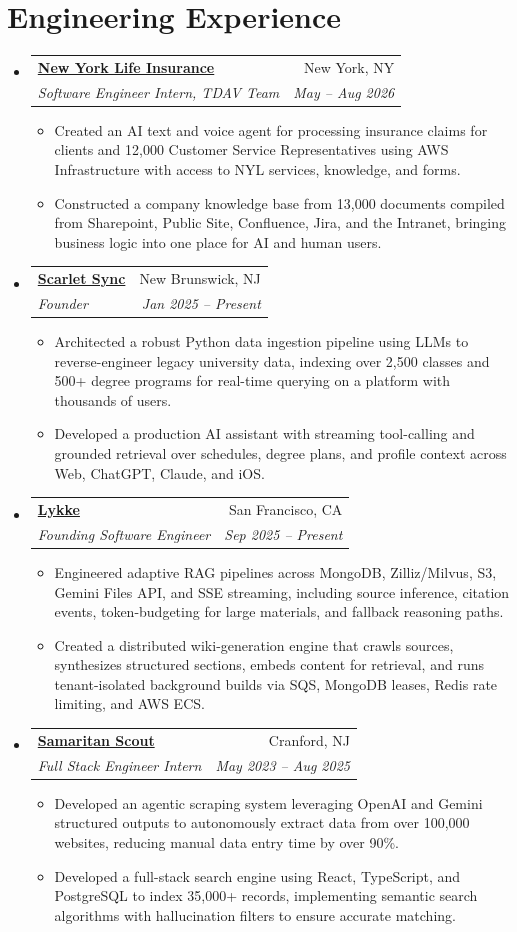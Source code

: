 \documentclass[letterpaper,11pt]{article}
\makeatletter
\newcommand{\resumeItem}[1]{
  \item\small{
    {#1 \vspace{-2pt}}
  }
}
\newcommand{\resumeSubheading}[4]{
  \vspace{-2pt}\item
    \begin{tabular*}{0.97\textwidth}[t]{l@{\extracolsep{\fill}}r}
      \textbf{#1} & #2 \\
      \textit{\small#3} & \textit{\small #4} \\
    \end{tabular*}\vspace{-7pt}
}
\newcommand{\resumeSubHeadingListStart}{\begin{itemize}[leftmargin=0.15in, label={}]}
\newcommand{\resumeSubHeadingListEnd}{\end{itemize}}
\newcommand{\resumeItemListStart}{\begin{itemize}}
\newcommand{\resumeItemListEnd}{\end{itemize}\vspace{-5pt}}
\makeatother
\begin{document}
\section{Engineering Experience}
  \resumeSubHeadingListStart
  \resumeSubheading
      {\href{https://newyorklife.com/}{New York Life Insurance}}{New York, NY}
      {Software Engineer Intern, TDAV Team}{May -- Aug 2026}
      \resumeItemListStart
        \resumeItem{Created an AI text and voice agent for processing insurance claims for clients and 12,000 Customer Service Representatives using AWS Infrastructure with access to NYL services, knowledge, and forms.}
        \resumeItem{Constructed a company knowledge base from 13,000 documents compiled from Sharepoint, Public Site, Confluence, Jira, and the Intranet, bringing business logic into one place for AI and human users.}
      \resumeItemListEnd
    \resumeSubheading
      {\href{https://scarletsync.app/}{Scarlet Sync}}{New Brunswick, NJ}
      {Founder}{Jan 2025 -- Present}
      \resumeItemListStart
        \resumeItem{Architected a robust Python data ingestion pipeline using LLMs to reverse-engineer legacy university data, indexing over 2,500 classes and 500+ degree programs for real-time querying on a platform with thousands of users.}
        \resumeItem{Developed a production AI assistant with streaming tool-calling and grounded retrieval over schedules, degree plans, and profile context across Web, ChatGPT, Claude, and iOS.}
      \resumeItemListEnd
    \resumeSubheading
  {\href{https://getlykke.com/}{Lykke}}{San Francisco, CA}
  {Founding Software Engineer}{Sep 2025 -- Present}
  \resumeItemListStart
    \resumeItem{Engineered adaptive RAG pipelines across MongoDB, Zilliz/Milvus, S3, Gemini Files API, and SSE streaming, including source inference, citation events, token-budgeting for large materials, and fallback reasoning paths.}
    \resumeItem{Created a distributed wiki-generation engine that crawls sources, synthesizes structured sections, embeds content for retrieval, and runs tenant-isolated background builds via SQS, MongoDB leases, Redis rate limiting, and AWS ECS.}
  \resumeItemListEnd
    \resumeSubheading
      {\href{https://www.samaritanscout.org/}{Samaritan Scout}}{Cranford, NJ}
      {Full Stack Engineer Intern}{May 2023 -- Aug 2025}
      \resumeItemListStart
        \resumeItem{Developed an agentic scraping system leveraging OpenAI and Gemini structured outputs to autonomously extract data from over 100,000 websites, reducing manual data entry time by over 90\%.}
        \resumeItem{Developed a full-stack search engine using React, TypeScript, and PostgreSQL to index 35,000+ records, implementing semantic search algorithms with hallucination filters to ensure accurate matching.}
      \resumeItemListEnd
  \resumeSubHeadingListEnd
\end{document}
